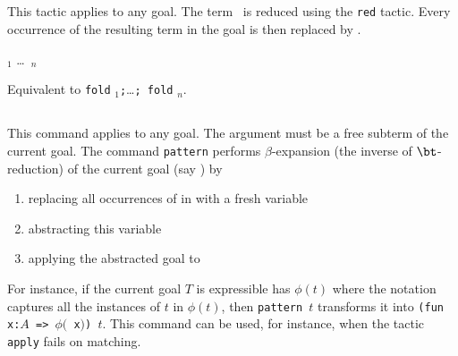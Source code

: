 \subsection{}

This tactic applies to any goal. The term \term\ is reduced using the {\tt red}
tactic. Every occurrence of the resulting term in the goal is then
replaced by \term.

\begin{Variants}
\item {} \term$_1$ \dots\ \term$_n$

  Equivalent to {\tt fold} \term$_1${\tt;}\ldots{\tt; fold} \term$_n$.
\end{Variants}

\subsection{}
\label{pattern}

This command applies to any goal. The argument {\term} must be a free
subterm of the current goal.  The command {\tt pattern} performs
$\beta$-expansion (the inverse of $\bt$-reduction) of the current goal
(say \T) by
\begin{enumerate}
\item replacing all occurrences of {\term} in {\T} with a fresh variable
\item abstracting this variable
\item applying the abstracted goal to {\term}
\end{enumerate}

For instance, if the current goal $T$ is expressible has $\phi(t)$
where the notation captures all the instances of $t$ in $\phi(t)$,
then {\tt pattern $t$} transforms it into {\tt (fun x:$A$ => $\phi(${\tt
x}$)$) $t$}.  This command can be used, for instance, when the tactic
{\tt apply} fails on matching.

